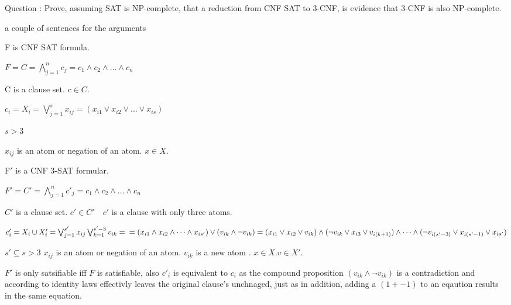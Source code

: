 \documentclass[a4paper]{report}
\begin{document}
Question : Prove, assuming SAT is NP-complete, that a reduction from CNF SAT to 3-CNF, is evidence that 3-CNF is also NP-complete.

a couple of sentences for the arguments

F is CNF SAT formula.

$F =  C = \bigwedge_{j=1}^{n} c_j = c_1 \wedge c_2 \wedge \dots \wedge c_n$

C is a clause set.
$c \in C$.

$c_i = X_i = \bigvee_{j=1}^{s} x_{ij} =  (x_{i1} \vee x_{i2} \vee \dots \vee x_{is})$

$s > 3 $

$x_{ij}$ is an atom or negation of an atom.
$x \in X$.


F$'$ is a CNF 3-SAT formular.

$F' =  C' = \bigwedge_{j=1}^{n} c'_j = c_1 \wedge c_2 \wedge \dots \wedge c_n$

$C'$ is a clause set.
$c' \in C' \quad c'$ is a clause with only three atoms.

$c'_i = X_i \cup X'_i = \bigvee_{j=1}^{s'} x_{ij} \bigvee_{k=1}^{s'-3}v_{ik}= \\= (x_{i1} \wedge x_{i2} \wedge \dots \wedge x_{is'}) \vee (v_{ik} \wedge \neg v_{ik})
\\ =  (x_{i1} \vee x_{i2} \vee v_{ik}) \wedge  (\neg v_{ik} \vee x_{i3} \vee  v_{i(k+1)}) \wedge \dots \wedge   (\neg v_{i(s'-3)} \vee x_{i(s'-1)} \vee x_{is'})$

$s' \subseteq s > 3  $
$x_{ij}$ is an atom or negation of an atom. $v_{ik}$ is a new atom .
$x \in X$.$v \in X'$.

$F'$ is only satsifiable iff $F$ is satisfiable, also $c'_i$ is equivalent to $c_i$ as the compound proposition $(v_{ik} \wedge \neg v_{ik})$ is a contradiction and according to identity laws effectivly leaves the original clause's unchnaged, just as in addition, adding a $(1 + -1)$ to an eqaution results in the same equation. 
\end{document}
